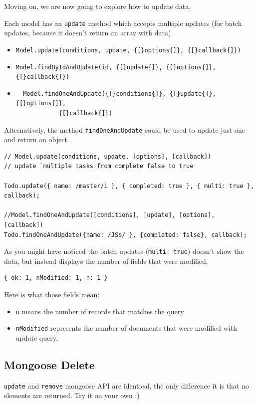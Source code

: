 \documentclass[12pt]{article}
\begin{document}
Moving on, we are now going to explore how to update data.

Each model has an \texttt{update} method which accepts multiple updates
(for batch updates, because it doesn't return an array with data).
\begin{itemize}
\item
  \verb!Model.update(conditions, update, {[}options{]}, {[}callback{]})!
\item
  \verb!Model.findByIdAndUpdate(id, {[}update{]}, {[}options{]}, {[}callback{]})!
\item
\begin{verbatim}
  Model.findOneAndUpdate({[}conditions{]}, {[}update{]}, {[}options{]}, 
  			{[}callback{]})
\end{verbatim}
\end{itemize}
Alternatively, the method \texttt{findOneAndUpdate} could be used to
update just one and return an object.
\begin{Verbatim}
// Model.update(conditions, update, [options], [callback])
// update `multiple tasks from complete false to true

Todo.update({ name: /master/i }, { completed: true }, { multi: true }, callback);

//Model.findOneAndUpdate([conditions], [update], [options], [callback])
Todo.findOneAndUpdate({name: /JS$/ }, {completed: false}, callback);
\end{Verbatim}
As you might have noticed the batch updates (\texttt{multi:\ true}) doesn't
show the data, but instead displays the number of fields that were modified.
\begin{Verbatim}
{ ok: 1, nModified: 1, n: 1 }
\end{Verbatim}
Here is what those fields mean:
\begin{itemize}
\item
  \texttt{n} means the number of records that matches the query
\item
  \texttt{nModified} represents the number of documents that were
  modified with update query.
\end{itemize}

\subsection{Mongoose Delete}

\texttt{update} and \texttt{remove} mongoose API are identical, the only
difference it is that no elements are returned. Try it on your own ;)
\end{document}
